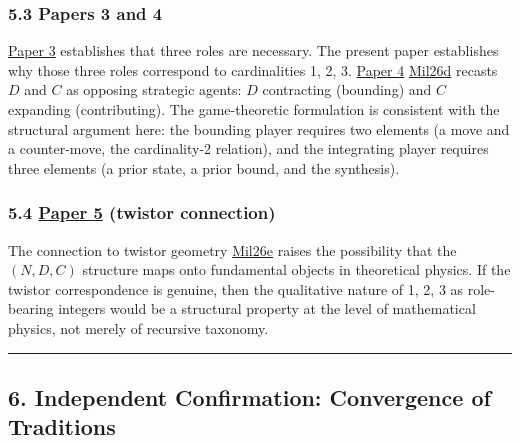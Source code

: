 \documentclass[
  11pt,
  letterpaper,
]{article}
\begin{document}
\subsubsection{5.3 Papers 3 and 4}\label{papers-3-and-4}

\href{https://github.com/baardev/truevalue/blob/main/docnav/Research/papers/3_minimal-recursive-triadic-framework/3_minimal-recursive-triadic-framework.pdf}{Paper
3} establishes that three roles are necessary. The present paper
establishes why those three roles correspond to cardinalities 1, 2, 3.
\href{https://github.com/baardev/truevalue/blob/main/docnav/Research/papers/4_game-theoretic-triadic-balance/4_game-theoretic-triadic-balance.pdf}{Paper
4}
\href{https://github.com/baardev/truevalue/blob/main/docnav/Research/papers/4_game-theoretic-triadic-balance/4_game-theoretic-triadic-balance.pdf}{Mil26d}
recasts \(D\) and \(C\) as opposing strategic agents: \(D\) contracting
(bounding) and \(C\) expanding (contributing). The game-theoretic
formulation is consistent with the structural argument here: the
bounding player requires two elements (a move and a counter-move, the
cardinality-2 relation), and the integrating player requires three
elements (a prior state, a prior bound, and the synthesis).

\subsubsection{\texorpdfstring{5.4
\href{https://github.com/baardev/truevalue/blob/main/docnav/Research/papers/5_tholonic-twistor-connection/5_tholonic-twistor-connection.pdf}{Paper
5} (twistor
connection)}{5.4 Paper 5 (twistor connection)}}\label{paper-5-twistor-connection}

The connection to twistor geometry
\href{https://github.com/baardev/truevalue/blob/main/docnav/Research/papers/5_tholonic-twistor-connection/5_tholonic-twistor-connection.pdf}{Mil26e}
raises the possibility that the \((N, D, C)\) structure maps onto
fundamental objects in theoretical physics. If the twistor
correspondence is genuine, then the qualitative nature of 1, 2, 3 as
role-bearing integers would be a structural property at the level of
mathematical physics, not merely of recursive taxonomy.

\begin{center}\rule{0.5\linewidth}{0.5pt}\end{center}

\subsection{6. Independent Confirmation: Convergence of
Traditions}\label{independent-confirmation-convergence-of-traditions}
\end{document}
